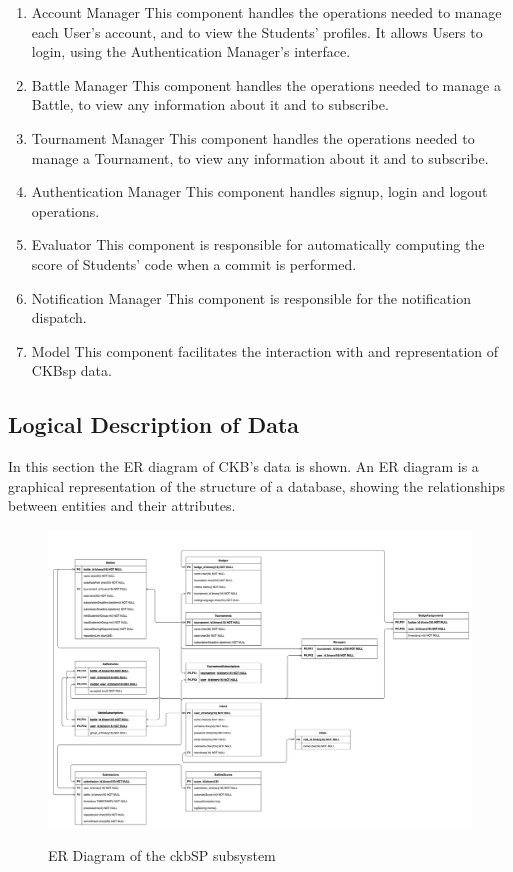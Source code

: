 \documentclass{Configuration_Files/Template}
\begin{document}
\begin{enumerate}
  \item \textcolor{bluepoli}{Account Manager} This component handles the operations needed to manage each User's account, and to view the Students' profiles. It allows Users to login, using the Authentication Manager's interface.
    \item \textcolor{bluepoli}{Battle Manager} This component handles the operations needed to manage a Battle, to view any information about it and to subscribe.
    \item \textcolor{bluepoli}{Tournament Manager} This component handles the operations needed to manage a Tournament, to view any information about it and to subscribe.
    \item \textcolor{bluepoli}{Authentication Manager} This component handles signup, login and logout operations.
    \item \textcolor{bluepoli}{Evaluator} This component is responsible for automatically computing the score of Students' code when a commit is performed. 
    \item \textcolor{bluepoli}{Notification Manager} This component is responsible for the notification dispatch.
    \item \textcolor{bluepoli}{Model} This component facilitates the interaction with and representation of CKBsp data.
\end{enumerate}

\subsection{Logical Description of Data}

In this section the ER diagram of CKB's data is shown. An ER diagram is a graphical representation of the structure of a database, showing the relationships between entities and their attributes.

\begin{figure}[H]
\centering
\includegraphics[scale = 0.3]{DD_latex/Images/diagrams/ER_Diagram.png}\\
\caption{ER Diagram of the ckbSP subsystem}
\end{figure}
\end{document}
